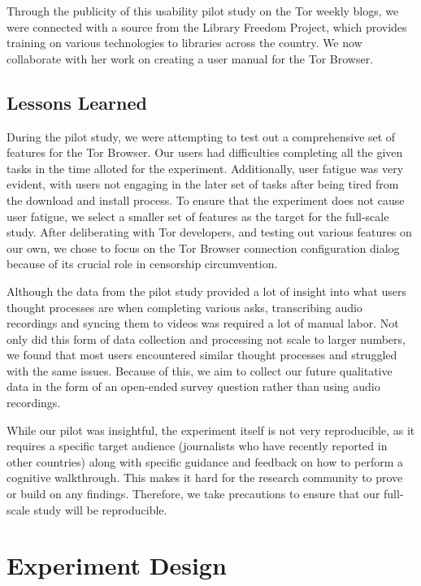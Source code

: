 \documentclass[letterpaper,twocolumn,11pt]{article}
\begin{document}
Through the publicity of this usability pilot study on the Tor weekly blogs, we were connected
with a source from the Library Freedom Project, which provides training on various technologies 
to libraries across the country. We now collaborate with her work on creating a user manual
for the Tor Browser. 

\subsection{Lessons Learned} 
\indent \indent During the pilot study, we were attempting to test out a comprehensive set of 
features for the Tor Browser. Our users had difficulties completing all the given tasks in the 
time alloted for the experiment. Additionally, user fatigue was very evident, with users not 
engaging in the later set of tasks after being tired from the download and install process. 
To ensure that the experiment does not cause user fatigue, we select a smaller set of features 
as the target for the full-scale study.  After deliberating with Tor developers, and testing out
various features on our own, we chose to focus on the Tor Browser connection configuration 
dialog because of its crucial role in censorship circumvention. 

Although the data from the pilot study provided a lot of insight into what users thought processes
are when completing various asks, transcribing audio recordings and syncing them to videos was
required a lot of manual labor. Not only did this form of data collection and processing not scale 
to larger numbers, we found that most users encountered similar thought processes and struggled
with the same issues. Because of this, we aim to collect our future qualitative data in the form of 
an open-ended survey question rather than using audio recordings. 

While our pilot was insightful, the experiment itself is not very reproducible, as it requires
a specific target audience (journalists who have recently reported in other countries) along 
with specific guidance and feedback on how to perform a cognitive walkthrough. This makes it hard
for the research community to prove or build on any findings. Therefore, we take precautions
to ensure that our full-scale study will be reproducible. 

\section{Experiment Design}
\end{document}
